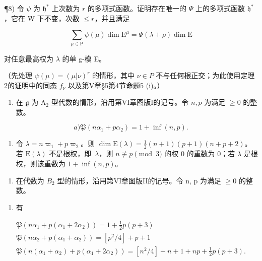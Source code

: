 ¶8) 令 \(\psi\) 为 \(\mathfrak{h}^*\) 上次数为 \(r\) 的多项式函数。证明存在唯一的 \(\varPsi\) 上的多项式函数 \(\mathfrak{h}^*\)，它在 W 下不变，次数 \(\leq r\)，并且满足

\[
\sum_ {\mu \in \mathrm{P}} \psi (\mu) \dim \mathrm{E} ^ {\mu} = \varPsi (\lambda + \rho) \dim \mathrm{E}
\]

对任意最高权为 \(\lambda\) 的单 g-模 E。

（先处理 \(\psi(\mu)=(\mu|\nu)^{r}\) 的情形，其中 \(\nu\in P\) 不与任何根正交；为此使用定理2的证明中的同态 \(f_{\nu}\) 以及第V章§5第4节命题5 (i)。）

\begin{enumerate}
\def\labelenumi{\arabic{enumi})}
\setcounter{enumi}{8}
\tightlist
\item
  在 \(\mathfrak{g}\) 为 \(\mathrm{A}_2\) 型代数的情形，沿用第VI章图版I的记号。令 \(n, p\) 为满足 \(\geq 0\) 的整数。
\end{enumerate}

\[
a) \mathfrak {P} (n \alpha_ {1} + p \alpha_ {2}) = 1 + \inf (n, p).
\]

\begin{enumerate}
\def\labelenumi{\alph{enumi})}
\setcounter{enumi}{1}
\tightlist
\item
  令 \(\lambda = n\varpi_1 + p\varpi_2\)。则 \(\dim \mathrm{E}(\lambda) = \frac{1}{2}(n + 1)(p + 1)(n + p + 2)\)。若 \(\mathrm{E}(\lambda)\) 不是根权，即~\(\lambda\)，则 \(n \not\equiv p \pmod{3}\) 的权 0 的重数为 0；若 \(\lambda\) 是根权，则该重数为 \(1 + \inf(n,p)\)。
\end{enumerate}

\begin{enumerate}
\def\labelenumi{\arabic{enumi})}
\setcounter{enumi}{9}
\tightlist
\item
  在代数为 \(B_{2}\) 型的情形，沿用第VI章图版II的记号。令 n, p 为满足 \(\geq 0\) 的整数。
\end{enumerate}

\begin{enumerate}
\def\labelenumi{\alph{enumi})}
\tightlist
\item
  有
\end{enumerate}

\[
\begin{array}{c} \mathfrak {P} (n \alpha_ {1} + p (\alpha_ {1} + 2 \alpha_ {2})) = 1 + \frac {1}{2} p (p + 3) \\ \mathfrak {P} (n \alpha_ {2} + p (\alpha_ {1} + \alpha_ {2})) = [ p ^ {2} / 4 ] + p + 1 \\ \mathfrak {P} (n (\alpha_ {1} + \alpha_ {2}) + p (\alpha_ {1} + 2 \alpha_ {2})) = [ n ^ {2} / 4 ] + n + 1 + n p + \frac {1}{2} p (p + 3). \end{array}
\]

